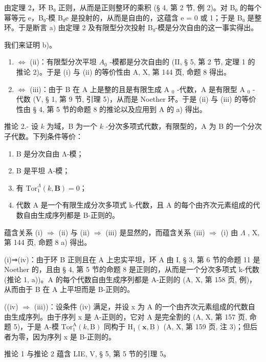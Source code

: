由定理 2，环 B₀ 正则，从而是正则整环的乘积 (§ 4, 第 2 节, 例 2)。对 B₀ 的每个幂等元 e，B₀-模 B₀e 是投射的，从而是自由的，这蕴含 e = 0 或 1；于是 B₀ 是整环。于是断言 a) 由定理 2 及有限型分次投射 B₀-模是分次自由的这一事实得出。

我们来证明 b)。

\begin{enumerate}
\def\labelenumi{(\roman{enumi})}
\item
  \(\Leftrightarrow\) (ii)：有限型分次平坦 \(A_0\) -模都是分次自由的 (II, § 5, 第 2 节, 定理 1 的推论 2)。于是 (i) 与 (ii) 的等价性由 A, X, 第 144 页, 命题 8 得出。
\item
  \(\Leftrightarrow\) (iii)：由于 B 在 A 上是整的且是有限生成 A \(_0\) -代数，A 是有限型 A \(_0\) -代数 (V, § 1, 第 9 节, 引理 5)，从而是 Noether 环。于是 (ii) 与 (iii) 的等价性由 § 4, 第 5 节的命题 8 的推论以及应用到 A 的 a) 得出。
\end{enumerate}

推论 2.- 设 \(k\) 为域，B 为一个 \(k\) -分次多项式代数，有限型的，A 为 B 的一个分次子代数。下列条件等价：

\begin{enumerate}
\def\labelenumi{(\roman{enumi})}
\item
  B 是分次自由 Λ-模；
\item
  B 是平坦 A-模；
\item
  有 \(\mathrm{Tor}_1^\Lambda (k,\mathbf{B}) = 0\)；
\item
  代数 A 是一个有限生成分次多项式 k-代数，且 A 的每个由齐次元素组成的代数自由生成序列都是 B-正则的。
\end{enumerate}

蕴含关系 (i) \(\Rightarrow\) (ii) 与 (ii) \(\Rightarrow\) (iii) 是显然的，而蕴含关系 (iii) \(\Rightarrow\) (i) 由 \(\Lambda\) , X, 第 144 页, 命题 8 a) 得出。

(i)⇒(iv)：由于环 B 正则且在 A 上忠实平坦，环 A 由 I, § 3, 第 6 节的命题 11 是 Noether 的，且由 § 4, 第 5 节的命题 8 是正则的，从而是一个分次多项式 k-代数 (推论 1, a))。A 的每个代数自由生成序列都是 A-正则的 (A, X, 第 158 页, 例)，从而由于 B 在 A 上平坦而是 B-正则的。

((iv) \(\Rightarrow\) (iii))：设条件 (iv) 满足，并设 x 为 A 的一个由齐次元素组成的代数自由生成序列。由于序列 x 是 A-正则的，它对 A 是完全割的 (A, X, 第 157 页, 命题 5)，于是 A-模 \(\mathrm{Tor}_{1}^{\mathrm{A}}(k,\mathrm{B})\) 同构于 \(\mathrm{H}_{1}(\mathbf{x},\mathrm{B})\) (A, X, 第 159 页, 注 3)；但后者为零，因为序列 x 是 B-正则的。

推论 1 与推论 2 蕴含 LIE, V, § 5, 第 5 节的引理 5。

